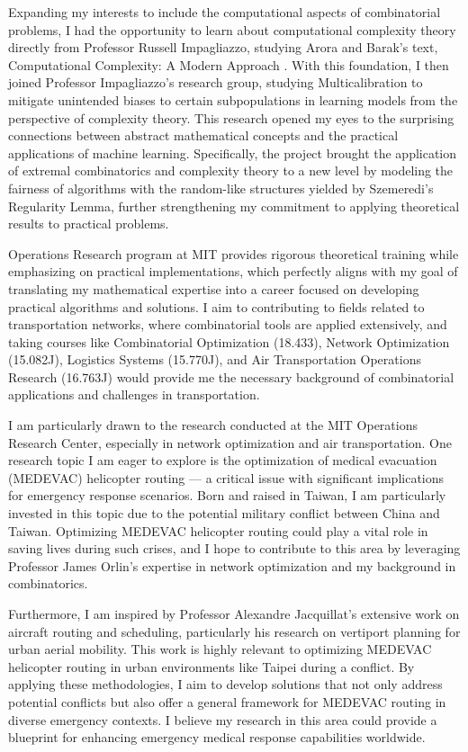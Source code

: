 \documentclass[12pt]{article}
\begin{document}
Expanding my interests to include the computational aspects of combinatorial problems, I had the
opportunity to learn about computational complexity theory directly from Professor Russell
Impagliazzo, studying Arora and Barak's text, Computational Complexity: A Modern Approach
\cite{arora2009computational}. With this foundation, I then joined Professor Impagliazzo's research
group, studying Multicalibration to mitigate unintended biases to certain subpopulations in learning
models from the perspective of complexity theory. This research opened my eyes to the surprising
connections between abstract mathematical concepts and the practical applications of machine
learning. Specifically, the project brought the application of extremal combinatorics and complexity
theory to a new level by modeling the fairness of algorithms with the random-like structures yielded
by Szemeredi's Regularity Lemma, further strengthening my commitment to applying theoretical results
to practical problems.

Operations Research program at MIT provides rigorous theoretical training while emphasizing on
practical implementations, which perfectly aligns with my goal of translating my mathematical
expertise into a career focused on developing practical algorithms and solutions. I aim to
contributing to fields related to transportation networks, where combinatorial tools are applied
extensively, and taking courses like Combinatorial Optimization (18.433), Network Optimization
(15.082J), Logistics Systems (15.770J), and Air Transportation Operations Research (16.763J) would
provide me the necessary background of combinatorial applications and challenges in transportation.

I am particularly drawn to the research conducted at the MIT Operations Research Center, especially
in network optimization and air transportation. One research topic I am eager to explore is the
optimization of medical evacuation (MEDEVAC) helicopter routing --- a critical issue with
significant implications for emergency response scenarios. Born and raised in Taiwan, I am
particularly invested in this topic due to the potential military conflict between China and Taiwan.
Optimizing MEDEVAC helicopter routing could play a vital role in saving lives during such crises,
and I hope to contribute to this area by leveraging Professor James Orlin's expertise in network
optimization and my background in combinatorics. 

Furthermore, I am inspired by Professor Alexandre Jacquillat's extensive work on aircraft routing
and scheduling, particularly his research on vertiport planning for urban aerial
mobility\cite{10.1287/msom.2022.1148}. This work is highly relevant to optimizing MEDEVAC helicopter
routing in urban environments like Taipei during a conflict. By applying these methodologies, I aim
to develop solutions that not only address potential conflicts but also offer a general framework
for MEDEVAC routing in diverse emergency contexts. I believe my research in this area could provide
a blueprint for enhancing emergency medical response capabilities worldwide.
\end{document}
